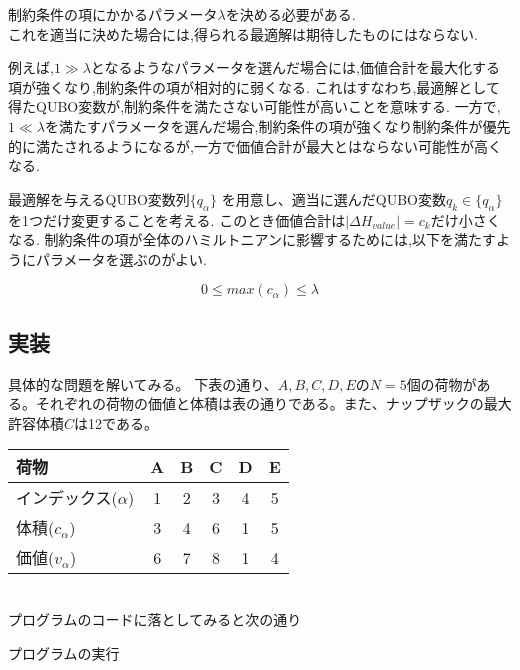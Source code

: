 \documentclass[uplatex,dvipdfmx,a4paper,11pt,oneside,openany]{jsbook}
\begin{document}
\begin{screen}
制約条件の項にかかるパラメータ$\lambda$を決める必要がある.\\
これを適当に決めた場合には,得られる最適解は期待したものにはならない.

例えば,$1\gg\lambda$となるようなパラメータを選んだ場合には,価値合計を最大化する項が強くなり,制約条件の項が相対的に弱くなる.
これはすなわち,最適解として得たQUBO変数が,制約条件を満たさない可能性が高いことを意味する.
一方で,$1\ll\lambda$を満たすパラメータを選んだ場合,制約条件の項が強くなり制約条件が優先的に満たされるようになるが,一方で価値合計が最大とはならない可能性が高くなる.

最適解を与えるQUBO変数列$\{q_\alpha\}$
を用意し、適当に選んだQUBO変数$q_k \in \{q_\alpha\}$を1つだけ変更することを考える.
このとき価値合計は$|\Delta H_{value}|=c_k$だけ小さくなる.
制約条件の項が全体のハミルトニアンに影響するためには,以下を満たすようにパラメータを選ぶのがよい.

\[
0 \le max(c_\alpha)\le\lambda
\]
\end{screen}

\subsection{実装}

具体的な問題を解いてみる。
下表の通り、$A,B,C,D,E$の$N=5$個の荷物がある。それぞれの荷物の価値と体積は表の通りである。また、ナップザックの最大許容体積$C$は12である。\\

\begin{tabular}{|l|ccccc|}\hline
  荷物 & A & B & C & D & E \\\hline
  インデックス($\alpha$) & 1 & 2 & 3 & 4 & 5 \\\hline
  体積($c_\alpha$) & 3 & 4 & 6 & 1 & 5 \\\hline
  価値($v_\alpha$) & 6 & 7 & 8 & 1 & 4 \\\hline
\end{tabular}\\

プログラムのコードに落としてみると次の通り



プログラムの実行
\end{document}

